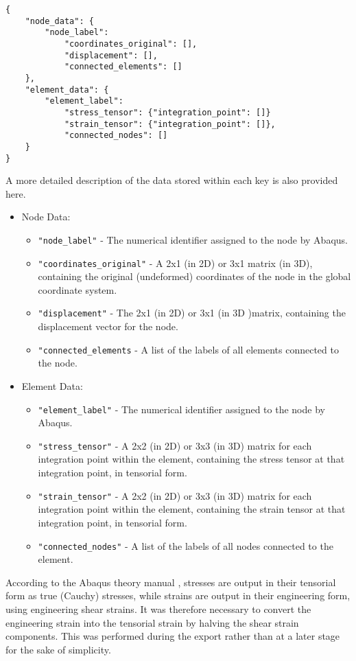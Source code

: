 \begin{verbatim}
{
    "node_data": {
        "node_label":
            "coordinates_original": [],
            "displacement": [],
            "connected_elements": []
    },
    "element_data": {
        "element_label":
            "stress_tensor": {"integration_point": []}
            "strain_tensor": {"integration_point": []},
            "connected_nodes": []
    }
}
\end{verbatim}

\newpage

A more detailed description of the data stored within each key is also provided here.

\begin{itemize}
	\item Node Data:
	\begin{itemize}
		\item \texttt{"node\_label"} - The numerical identifier assigned to the node by Abaqus.
		\item \texttt{"coordinates\_original"} - A 2x1 (in 2D) or 3x1 matrix (in 3D), containing the original (undeformed) coordinates of the node in the global coordinate system.
		\item \texttt{"displacement"} - The 2x1 (in 2D) or 3x1 (in 3D )matrix, containing the displacement vector for the node.
		\item \texttt{"connected\_elements} - A list of the labels of all elements connected to the node.
	\end{itemize}
	\item Element Data:
	\begin{itemize}
		\item \texttt{"element\_label"} - The numerical identifier assigned to the node by Abaqus.
		\item \texttt{"stress\_tensor"} - A 2x2 (in 2D) or 3x3 (in 3D) matrix for each integration point within the element, containing the stress tensor at that integration point, in tensorial form.
		\item \texttt{"strain\_tensor"} - A 2x2 (in 2D) or 3x3 (in 3D) matrix for each integration point within the element, containing the strain tensor at that integration point, in tensorial form.
		\item \texttt{"connected\_nodes"} - A list of the labels of all nodes connected to the element.
	\end{itemize}
\end{itemize}

According to the Abaqus theory manual \cite{systemes_122_nodate}, stresses are output in their tensorial form as true (Cauchy) stresses, while strains are output in their engineering form, using engineering shear strains. It was therefore necessary to convert the engineering strain into the tensorial strain by halving the shear strain components. This was performed during the export rather than at a later stage for the sake of simplicity.


